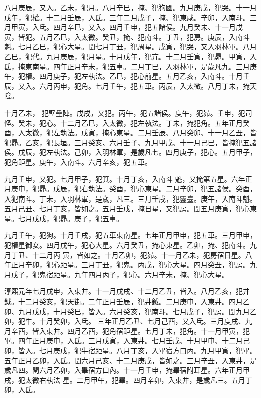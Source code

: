 \begin{pinyinscope}
 八月庚辰，又入。乙未，犯月。八月辛巳，掩、犯狗國。九月庚戌，犯哭。十一月戊午，犯權。十二月壬辰，入氐。三年二月戊子，掩、犯東咸。辛卯，入南斗。三月甲寅，入氐。四月辛巳，又入。四月壬申，犯五諸侯。九月癸未、十一月戊
 寅，皆犯。五月乙巳，入太微。癸丑，掩、犯南斗。丁丑，犯房。庚辰，入南斗魁。七月乙巳，犯心大星。閏七月丁丑，犯周星。戊寅，犯哭，又入羽林軍。八月乙巳，犯代。九月庚辰，犯月星。十月戊午，犯亢。十二月壬寅，犯昴。甲寅，入氐，掩東南星。四年正月辛未，犯五車。二月丁巳，入羽林軍，是歲凡九。三月庚午，犯權。四月庚子，犯左執法。乙巳，犯心前星。五月乙亥，入南斗。十月壬辰，又入。六月丙申，犯角。七月壬午，犯五車。丙辰，入太微。八月丁未，掩天陰。



 十月乙未，
 犯壁壘陣。戊戌，又犯。丙午，犯五諸侯。庚午，犯昴。壬申，犯司怪。癸未，犯心。十二月乙巳，入太微，犯左執法。丁未，掩犯角。五年正月癸酉，入太微，犯左執法。戊寅，掩心東星。二月壬辰、八月癸卯、十一月乙丑，皆犯昴。乙亥，犯長垣。三月癸亥、六月壬子、九月甲戌、十一月己巳，皆掩犯五諸侯。戊辰，犯左執法。己卯，入羽林軍，是歲凡七。四月庚子，犯心。五月甲子，犯角距星。庚午，入南斗。六月辛亥，犯五車。



 九月壬申，又犯。七月甲子，犯箕。十月丁亥，入南斗
 魁，又掩第五星。六年正月庚申，犯昴。戊辰，犯右執法。癸酉，犯心東星。二月辛卯，犯五諸侯。癸酉，入犯南斗。丁未，入羽林軍，是歲，凡三。三月壬戌，犯靈臺。庚午，入南斗魁。五月己丑、七月丁亥，皆如之。五月壬戌，掩日星，又犯房。閏五月庚寅，犯心東星。七月戊戌，犯昴。庚子，犯五車。



 九月壬午，犯狗。十月壬戌，犯五車東南星。七年正月甲申，犯五車。三月甲申，犯權星御女。四月戊午，犯心大星。六月癸丑，掩心東星。乙卯，掩、犯南斗。九月丁丑、十二月丙
 寅，皆如之。十月乙卯，犯昴。十一月乙未，犯房宿日星。八年正月辛卯，犯心距星。三月丁丑，犯鬼。丙戌，犯心大星。四月癸丑，犯房。九月戊子，犯鬼宿距星。九年四月丙子，犯心。六月辛未，掩、犯心大星。



 淳熙元年七月戊申，入東井。十一月戊戌、十二月乙丑，皆入。八月乙亥，犯井鉞。十二月癸亥，犯天街。二年正月壬辰，犯井鉞。二月庚申，入東井。四月乙卯、九月戊戌，十月癸巳，皆入。六月癸亥，犯南斗。七月戊子，犯房。閏九月乙卯，犯牛。十月癸卯，入氐。
 三年正月乙丑、七月己酉，又入氐。三月庚戌、九月辛酉，皆入東井。四月乙酉，犯角宿距星。七月丁未，犯角。十一月甲寅，犯畢。四年正月庚申，入氐。三月戊寅，入東井。七月壬戌、十月甲申、十二月己卯，皆入。七月庚戌，犯牛宿距星。八月丁亥，入畢宿方口內。九月甲寅，犯畢。五年正月乙卯，入氐。閏六月己亥、十二月庚戌，皆如之。三月辛丑，入東井，是歲凡四。閏六月乙卯，入畢宿方口內。十一月壬申，掩畢宿附耳星。六年正月甲戌，犯太微右執法
 星。二月甲午，犯畢。四月辛卯，入東井，是歲凡三。五月丁卯，入氐。




\end{pinyinscope}
